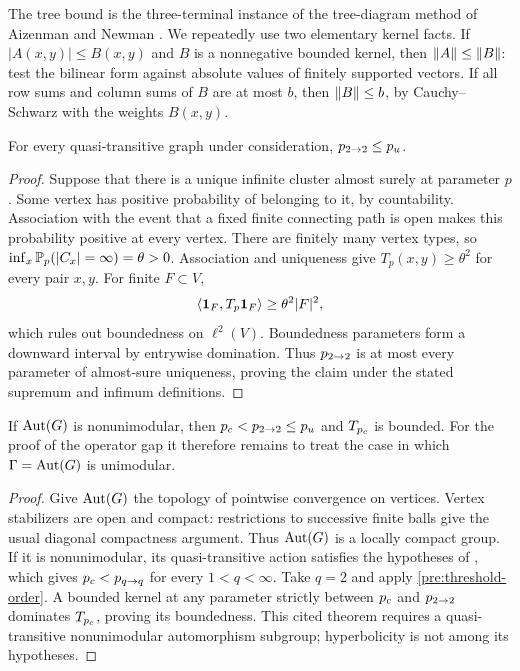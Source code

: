The tree bound is the three-terminal instance of the tree-diagram
method of Aizenman and Newman \cite{AizenmanNewman1984}.
We repeatedly use two elementary kernel facts. If $|A(x,y)|\le B(x,y)$
and $B$ is a nonnegative bounded kernel, then $\lVert A\rVert\le\lVert B\rVert$:
test the bilinear form against absolute values of finitely supported
vectors. If all row sums and column sums of $B$ are at most $b$, then
$\lVert B\rVert\le b$, by Cauchy--Schwarz with the weights $B(x,y)$.

\begin{lemma}
\label{pre:threshold-order}
For every quasi-transitive graph under consideration,
${p_{2\to2}}\le{p_u}$.
\end{lemma}
\begin{proof}
Suppose that there is a unique infinite cluster almost surely at
parameter $p$. Some vertex has positive probability of belonging to
it, by countability. Association with the event that a fixed finite
connecting path is open makes this probability positive at every
vertex. There are finitely many vertex types, so
$\inf_x\mathbb P_p(|C_x|=\infty)=\theta>0$. Association and uniqueness give
$T_p(x,y)\ge\theta^2$ for every pair $x,y$. For finite $F\subset V$,
\[
 \langle\mathbf 1_F,T_p\mathbf 1_F\rangle\ge\theta^2|F|^2,
\]
which rules out boundedness on $\ell^2(V)$. Boundedness parameters
form a downward interval by entrywise domination. Thus ${p_{2\to2}}$ is
at most every parameter of almost-sure uniqueness, proving the claim
under the stated supremum and infimum definitions.
\end{proof}

\begin{proposition}
\label{pre:unimodular-reduction}
If $\operatorname{Aut}(G)$ is nonunimodular, then ${p_c}<{p_{2\to2}}\le{p_u}$ and
$T_{p_c}$ is bounded.
For the proof of the operator gap it therefore remains to treat the
case in which $\Gamma=\operatorname{Aut}(G)$ is unimodular.
\end{proposition}
\begin{proof}
Give $\operatorname{Aut}(G)$ the topology of pointwise convergence on vertices.
Vertex stabilizers are open and compact: restrictions to successive
finite balls give the usual diagonal compactness argument. Thus
$\operatorname{Aut}(G)$ is a locally compact group. If it is nonunimodular, its
quasi-transitive action satisfies the hypotheses of
\cite[Theorem~2.9]{Hutchcroft2019}, which gives
${p_c}<p_{q\to q}$ for every $1<q<\infty$. Take $q=2$ and apply
\cref{pre:threshold-order}. A bounded kernel at any parameter strictly
between ${p_c}$ and ${p_{2\to2}}$ dominates $T_{p_c}$, proving its boundedness.
This cited theorem requires a
quasi-transitive nonunimodular automorphism subgroup; hyperbolicity
is not among its hypotheses.
\end{proof}

